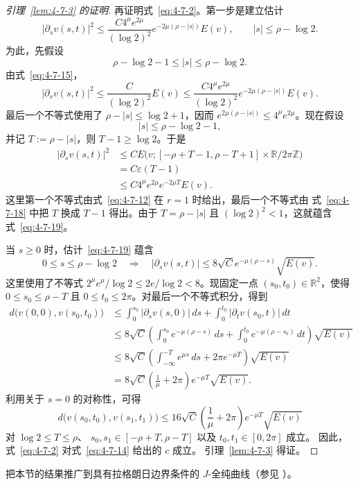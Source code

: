 \begin{proof}[引理~\ref{lem:4-7-3} 的证明]
再证明式~\eqref{eq:4-7-2}。第一步是建立估计
\begin{equation}\label{eq:4-7-19}
  |\partial_sv(s,t)|^2
  \le\frac{C4^\mu e^{2\mu}}{(\log2)^2}
  e^{-2\mu(\rho-|s|)}E(v),
  \qquad |s|\le\rho-\log2.
\end{equation}
为此，先假设
\[
  \rho-\log2-1\le|s|\le\rho-\log2.
\]
由式~\eqref{eq:4-7-15}，
\[
  |\partial_sv(s,t)|^2
  \le\frac C{(\log2)^2}E(v)
  \le\frac{C4^\mu e^{2\mu}}{(\log2)^2}
  e^{-2\mu(\rho-|s|)}E(v).
\]
最后一个不等式使用了
$\rho-|s|\le\log2+1$，因而
$e^{2\mu(\rho-|s|)}\le4^\mu e^{2\mu}$。现在假设
\[
  |s|\le\rho-\log2-1,
\]
并记 $T:=\rho-|s|$，则 $T-1\ge\log2$。于是
\[
  \begin{aligned}
  |\partial_sv(s,t)|^2
  &\le C E\bigl(v;
    [-\rho+T-1,\rho-T+1]\times\mathbb R/2\pi\mathbb Z\bigr)\\
  &=C\varepsilon(T-1)\\
  &\le C4^\mu e^{2\mu}e^{-2\mu T}E(v).
  \end{aligned}
\]
这里第一个不等式由式~\eqref{eq:4-7-12} 在 $r=1$ 时给出，最后一个不等式由
式~\eqref{eq:4-7-18} 中把 $T$ 换成 $T-1$ 得出。由于
$T=\rho-|s|$ 且 $(\log2)^2<1$，这就蕴含式~\eqref{eq:4-7-19}。

当 $s\ge0$ 时，估计~\eqref{eq:4-7-19} 蕴含
\[
  0\le s\le\rho-\log2
  \quad\Longrightarrow\quad
  |\partial_sv(s,t)|
  \le8\sqrt C e^{-\mu(\rho-s)}\sqrt{E(v)}.
\]
这里使用了不等式
$2^\mu e^\mu/\log2\le2e/\log2<8$。现固定一点
$(s_0,t_0)\in\mathbb R^2$，使得
$0\le s_0\le\rho-T$ 且 $0\le t_0\le2\pi$。对最后一个不等式积分，得到
\[
  \begin{aligned}
  d\bigl(v(0,0),v(s_0,t_0)\bigr)
  &\le\int_0^{s_0}|\partial_sv(s,0)|\,ds
    +\int_0^{t_0}|\partial_tv(s_0,t)|\,dt\\
  &\le8\sqrt C\left(
    \int_0^{s_0}e^{-\mu(\rho-s)}\,ds
    +\int_0^{t_0}e^{-\mu(\rho-s_0)}\,dt\right)\sqrt{E(v)}\\
  &\le8\sqrt C\left(
    \int_{-\infty}^{-T}e^{\mu s}\,ds
    +2\pi e^{-\mu T}\right)\sqrt{E(v)}\\
  &=8\sqrt C\left(\frac1\mu+2\pi\right)
    e^{-\mu T}\sqrt{E(v)}.
  \end{aligned}
\]
利用关于 $s=0$ 的对称性，可得
\[
  d\bigl(v(s_0,t_0),v(s_1,t_1)\bigr)
  \le16\sqrt C\left(\frac1\mu+2\pi\right)
  e^{-\mu T}\sqrt{E(v)}
\]
对 $\log2\le T\le\rho$、
$s_0,s_1\in[-\rho+T,\rho-T]$ 以及 $t_0,t_1\in[0,2\pi]$ 成立。
因此，式~\eqref{eq:4-7-2} 对式~\eqref{eq:4-7-14} 给出的 $c$ 成立。
引理~\ref{lem:4-7-3} 得证。
\end{proof}

\begin{exercise}\label{ex:4-7-6}
把本节的结果推广到具有拉格朗日边界条件的 $J$-全纯曲线（参见 ）。
\end{exercise}
